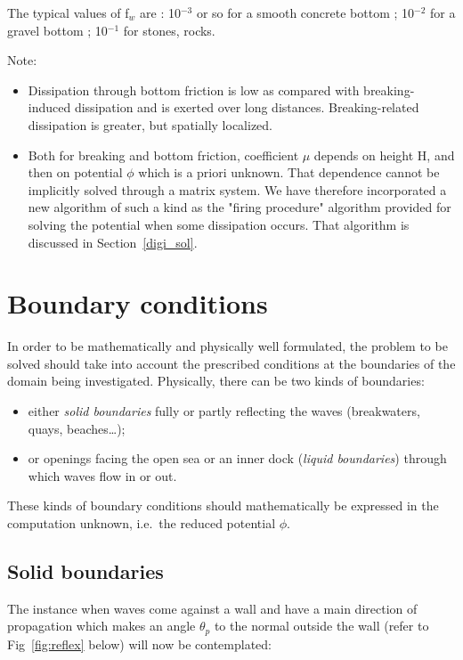 The typical values of f${}_{w}$ are : 10${}^{-3}$ or so for a smooth concrete bottom ; 10${}^{-2}$ for a gravel bottom ; 10${}^{-1}$ for stones, rocks.

Note:

\begin{itemize}
\item  Dissipation through bottom friction is low as compared with
  breaking-induced dissipation and is exerted over long distances.
    Breaking-related dissipation is greater, but spatially localized.

\item  Both for breaking and bottom friction, coefficient $\mu$ depends on
  height H, and then on potential $\phi$ which is a priori unknown. That
    dependence cannot be implicitly solved through a matrix system. We have
    therefore incorporated a new algorithm of such a kind as the "firing
    procedure" algorithm provided for solving the potential when some
    dissipation occurs. That algorithm is discussed in Section~\ref{digi_sol}.
\end{itemize}


\section{Boundary conditions}

In order to be mathematically and physically well formulated, the problem to be
solved should take into account the prescribed conditions at the boundaries of
the domain being investigated. Physically, there can be two kinds of boundaries:

\begin{itemize}
\item  either \textit{solid boundaries} fully or partly reflecting the waves
  (breakwaters, quays, beaches\ldots);

\item  or openings facing the open sea or an inner dock (\textit{liquid
  boundaries}) through which waves flow in or out.
\end{itemize}

These kinds of boundary conditions should mathematically be expressed in the
computation unknown, i.e.\ the reduced potential $\phi$.


\subsection{Solid boundaries}

The instance when waves come against a wall and have a main direction of
propagation which makes an angle $\theta_{p}$ to the normal outside the
wall (refer to Fig~\ref{fig:reflex} below) will now be contemplated:

